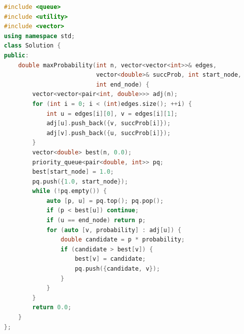 \documentclass[11pt]{article}
\begin{document}
\begin{lstlisting}[language=C++,caption={P04 --- C++17},label={lst:p04-cpp}]
#include <queue>
#include <utility>
#include <vector>
using namespace std;
class Solution {
public:
    double maxProbability(int n, vector<vector<int>>& edges,
                          vector<double>& succProb, int start_node,
                          int end_node) {
        vector<vector<pair<int, double>>> adj(n);
        for (int i = 0; i < (int)edges.size(); ++i) {
            int u = edges[i][0], v = edges[i][1];
            adj[u].push_back({v, succProb[i]});
            adj[v].push_back({u, succProb[i]});
        }
        vector<double> best(n, 0.0);
        priority_queue<pair<double, int>> pq;
        best[start_node] = 1.0;
        pq.push({1.0, start_node});
        while (!pq.empty()) {
            auto [p, u] = pq.top(); pq.pop();
            if (p < best[u]) continue;
            if (u == end_node) return p;
            for (auto [v, probability] : adj[u]) {
                double candidate = p * probability;
                if (candidate > best[v]) {
                    best[v] = candidate;
                    pq.push({candidate, v});
                }
            }
        }
        return 0.0;
    }
};
\end{lstlisting}
\end{document}
